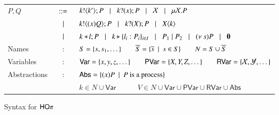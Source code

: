 \begin{figure}
		\begin{tabular}{lcl}
			$P,Q$	&$\;\;::=\;\;$&	$k ! \langle k' \rangle ; P \;\;\;|\;\;\; k ? (x) ; P \;\;\;|\;\;\; \mathcal{X} \;\;\;|\;\;\; \mu \mathcal{X}. P$\\
			&$\;\;\;|\;\;\;$&	$k ! \langle (x)Q \rangle ; P \;\;\;|\;\;\; k ? (X) ; P \;\;\;|\;\;\; X\langle k \rangle$\\ 
			&$\;\;\;|\;\;\;$&	$k \triangleleft l ; P \;\;\;|\;\;\; k \triangleright \{l_i:P_i\}_{i \in I} \;\;\;|\;\;\; 
					P_1 \;|\; P_2 \;\;\;|\;\;\; (\nu\ s) P \;\;\;|\;\;\; \mathbf{0}$\\
			Names & : & 	$S = \{s, s_1, \dots\} \qquad \overline{S} = \{\overline{s} \ \ |\ \  s \in S\} \qquad N = S \cup \overline{S}$\\
			Variables & : &	$\mathsf{Var} = \{x,y,z, \dots\} \qquad \mathsf{PVar} = \{X, Y, Z, \dots\}
					\qquad \mathsf{RVar} = \{\mathcal{X}, \mathcal{Y}, \dots\}$\\
			Abstractions & : & $\mathsf{Abs} = \{(x)P \ \ |\ \  P \textrm{ is a process}\}$\\
				& &	$k \in N \cup \mathsf{Var} \quad \qquad V \in N \cup \mathsf{Var} \cup \mathsf{PVar} \cup \mathsf{RVar} \cup \mathsf{Abs}$ 
		\end{tabular}
%
%

	\caption{Syntax for $\mathsf{HO}\pi$ \label{fig:syntax}}
\end{figure}

